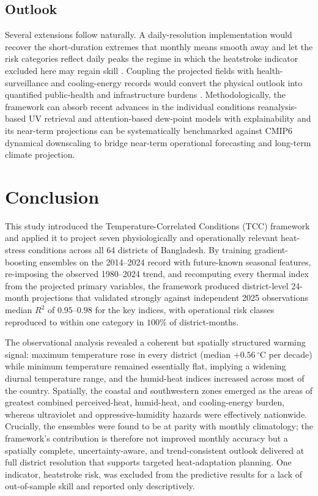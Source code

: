 \documentclass[review,11pt]{elsarticle}
\newcommand{\degC}{\ensuremath{^{\circ}\mathrm{C}}}
\begin{document}
\subsection{Outlook}
Several extensions follow naturally. A daily-resolution implementation would
recover the short-duration extremes that monthly means smooth away and let the risk
categories reflect daily peaks the regime in which the heatstroke indicator
excluded here may regain skill \citep{ehsan2026extremeheat}. Coupling the projected
fields with health-surveillance and cooling-energy records would convert the
physical outlook into quantified public-health and infrastructure burdens
\citep{miah2026}. Methodologically, the framework can absorb recent advances in the
individual conditions reanalysis-based UV retrieval \citep{teggi2026uvindex} and
attention-based dew-point models with explainability \citep{abdullah2025xai} and
its near-term projections can be systematically benchmarked against CMIP6 dynamical
downscaling \citep{khatun2024} to bridge near-term operational forecasting and
long-term climate projection.

\section{Conclusion}\label{sec:conclusion}
This study introduced the Temperature-Correlated Conditions (TCC) framework and
applied it to project seven physiologically and operationally relevant heat-stress
conditions across all 64 districts of Bangladesh. By training gradient-boosting
ensembles on the 2014--2024 record with future-known seasonal features,
re-imposing the observed 1980--2024 trend, and recomputing every thermal index
from the projected primary variables, the framework produced district-level
24-month projections that validated strongly against independent 2025
observations median $R^{2}$ of $0.95$--$0.98$ for the key indices, with
operational risk classes reproduced to within one category in $100\%$ of
district-months.

The observational analysis revealed a coherent but spatially structured warming
signal: maximum temperature rose in every district (median $+0.56\,\degC$ per
decade) while minimum temperature remained essentially flat, implying a widening
diurnal temperature range, and the humid-heat indices increased across most of the
country. Spatially, the coastal and southwestern zones emerged as the areas of
greatest combined perceived-heat, humid-heat, and cooling-energy burden, whereas
ultraviolet and oppressive-humidity hazards were effectively nationwide. Crucially,
the ensembles were found to be at parity with monthly climatology; the framework's
contribution is therefore not improved monthly accuracy but a spatially complete,
uncertainty-aware, and trend-consistent outlook delivered at full district
resolution that supports targeted heat-adaptation planning. One indicator,
heatstroke risk, was excluded from the predictive results for a lack of
out-of-sample skill and reported only descriptively.
\end{document}
